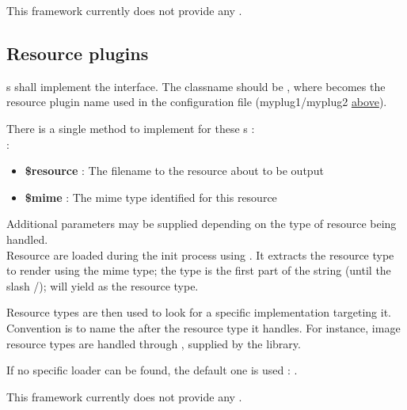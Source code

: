 \documentclass[pdftex,12pt,a4paper]{article}
\begin{document}
This framework currently does not provide any .

\subsection{Resource plugins} \label{sec:resource-plugins}

s shall implement the  interface. The classname should be , where  becomes the resource plugin name used in the configuration file (\eg myplug1/myplug2 \hyperref[code:plugin-config]{above}).

There is a single method to implement for these s :\\
 :
\begin{itemize}
	\item \textbf{\$resource} : The filename to the resource about to be output
	\item \textbf{\$mime} : The mime type identified for this resource
\end{itemize}

Additional parameters may be supplied depending on the type of resource being handled.\\
Resource are loaded during the init process using .
It extracts the resource type to render using the mime type; the type is the first part of the string (until the slash /);
\ie {} will yield  as the resource type.

Resource types are then used to look for a specific  implementation targeting it.\\
Convention is to name the  after the resource type it handles.
For instance, image resource types are handled through , supplied by the library.

If no specific loader can be found, the default one is used : .

This framework currently does not provide any .
\end{document}
